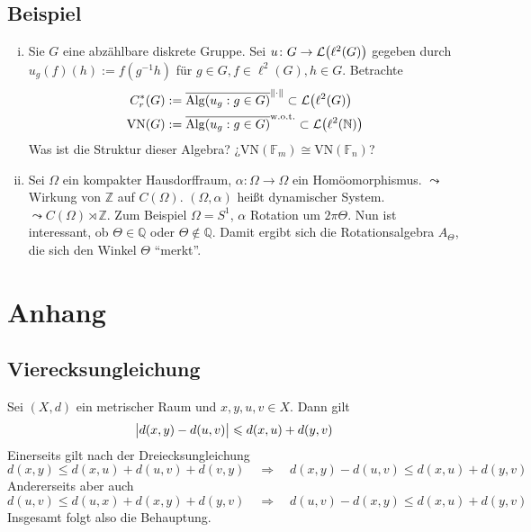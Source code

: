 \subsection{Beispiel} %
\label{sub:102}
\begin{enumerate}[(i)]
	\item Sie $G$ eine abzählbare diskrete Gruppe. Sei $u \colon G \to \mathcal{L}\enbrace*{\ell^2(G)}$ gegeben durch $u_g(f)(h) := f (g ^{-1} h)$ für 
	$g \in G, f \in \ell^2(G), h \in G$. Betrachte 
	\begin{align*}
		C_r^*(G) &:= \overline{\mathrm{Alg}(u_g : g \in G)}^{\norm{\cdot}} \subset \mathcal{L}\enbrace*{\ell^2(G)} \\
		\mathrm{VN}(G) &:= \overline{\mathrm{Alg}(u_g : g \in G)}^{\mathrm{w.o.t.}} \subset \mathcal{L}\enbrace*{\ell^2(\mathds{N})} 
	\end{align*}
	Was ist die Struktur dieser Algebra? ¿$\mathrm{VN}(\mathds{F}_m) \cong \mathrm{VN}(\mathds{F}_n)$?
	\item Sei $\Omega$ ein kompakter Hausdorffraum, $\alpha \colon \Omega \to \Omega$ ein Homöomorphismus. $\leadsto$ Wirkung von $\mathds{Z}$ auf $C(\Omega)$.
	$(\Omega,\alpha)$ heißt dynamischer System. $\leadsto C(\Omega) \rtimes \mathds{Z}$. Zum Beispiel
	$\Omega =S^1$, $\alpha$ Rotation um $2 \pi \Theta$. Nun ist interessant, ob $\Theta \in \mathds{Q}$ oder $\Theta \not\in \mathds{Q}$. Damit ergibt sich die 
	Rotationsalgebra $A_\Theta$, die sich den Winkel $\Theta$ \enquote{merkt}.
\end{enumerate}

\cleardoubleoddemptypage
\appendix
\section{Anhang} %
\label{sec:anhang}

\subsection{Vierecksungleichung} %
\label{sub:vier_ungl}
Sei $(X,d)$ ein metrischer Raum und $x,y,u,v \in X$. Dann gilt
\[
	\abs[\big]{d(x,y) - d(u,v)} \le d(x,u) + d(y,v) 
\]
Einerseits gilt nach der Dreiecksungleichung
\[
	d(x,y) \le d(x,u) + d(u,v) + d(v,y) \quad \Longrightarrow \quad d(x,y) - d(u,v) \le d(x,u) + d(y,v)
\]
Andererseits aber auch
\[
	d(u,v) \le d(u,x) + d(x,y) + d(y,v) \quad \Longrightarrow \quad d(u,v) - d(x,y) \le d(x,u) + d(y,v)
\]
Insgesamt folgt also die Behauptung. \bewende

